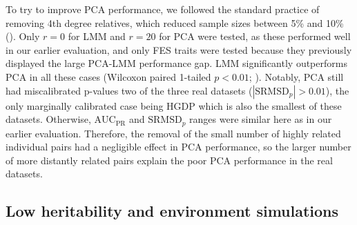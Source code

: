 \documentclass[9pt,lineno]{elife}
\newcommand{\rmsd}{\text{SRMSD}_p}
\newcommand{\auc}{\text{AUC}_\text{PR}}
\begin{document}
To try to improve PCA performance, we followed the standard practice of removing 4th degree relatives, which reduced sample sizes between 5\% and 10\% ().
Only $r=0$ for LMM and $r=20$ for PCA were tested, as these performed well in our earlier evaluation, and only FES traits were tested because they previously displayed the large PCA-LMM performance gap.
LMM significantly outperforms PCA in all these cases (Wilcoxon paired 1-tailed $p < 0.01$; ).
Notably, PCA still had miscalibrated p-values two of the three real datasets ($|\rmsd| > 0.01$), the only marginally calibrated case being HGDP which is also the smallest of these datasets.
Otherwise, $\auc$ and $\rmsd$ ranges were similar here as in our earlier evaluation.
Therefore, the removal of the small number of highly related individual pairs had a negligible effect in PCA performance, so the larger number of more distantly related pairs explain the poor PCA performance in the real datasets.

\subsection{Low heritability and environment simulations}
\end{document}
